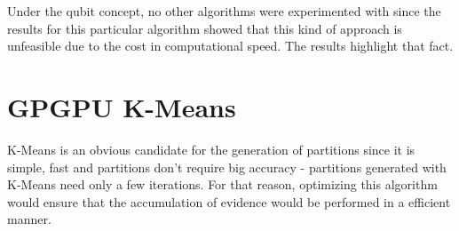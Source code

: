 Under the qubit concept, no other algorithms were experimented with since the results for this particular algorithm showed that this kind of approach is unfeasible due to the cost in computational speed. The results highlight that fact.




\section{GPGPU K-Means}
K-Means is an obvious candidate for the generation of partitions since it is simple, fast and partitions don't require big accuracy - partitions generated with K-Means need only a few iterations. For that reason, optimizing this algorithm would ensure that the accumulation of evidence would be performed in a efficient manner.




